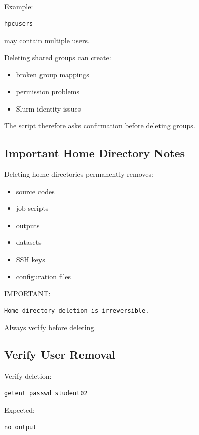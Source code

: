 \documentclass[11pt]{article}
\begin{document}
Example:

\begin{verbatim}
hpcusers
\end{verbatim}

may contain multiple users.

Deleting shared groups can create:

\begin{itemize}
\item broken group mappings
\item permission problems
\item Slurm identity issues
\end{itemize}

The script therefore asks confirmation before deleting groups.
\subsection{Important Home Directory Notes}
\label{sec:org0416084}

Deleting home directories permanently removes:

\begin{itemize}
\item source codes
\item job scripts
\item outputs
\item datasets
\item SSH keys
\item configuration files
\end{itemize}

IMPORTANT:

\begin{verbatim}
Home directory deletion is irreversible.
\end{verbatim}

Always verify before deleting.
\subsection{Verify User Removal}
\label{sec:org0e1a791}

Verify deletion:

\begin{verbatim}
getent passwd student02
\end{verbatim}

Expected:

\begin{verbatim}
no output
\end{verbatim}
\end{document}
